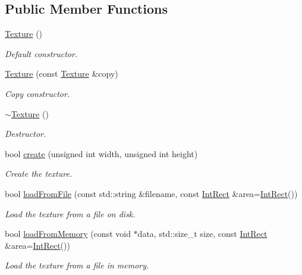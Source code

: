 \subsection*{Public Member Functions}
\begin{DoxyCompactItemize}
\item 
\mbox{\hyperlink{classsf_1_1_texture_a3e04674853b8533bf981db3173e3a4a7}{Texture}} ()
\begin{DoxyCompactList}\small\item\em Default constructor. \end{DoxyCompactList}\item 
\mbox{\hyperlink{classsf_1_1_texture_a524855cbf89de3b74be84d385fd229de}{Texture}} (const \mbox{\hyperlink{classsf_1_1_texture}{Texture}} \&copy)
\begin{DoxyCompactList}\small\item\em Copy constructor. \end{DoxyCompactList}\item 
\mbox{\hyperlink{classsf_1_1_texture_a9c5354ad40eb1c5aeeeb21f57ccd7e6c}{$\sim$\+Texture}} ()
\begin{DoxyCompactList}\small\item\em Destructor. \end{DoxyCompactList}\item 
bool \mbox{\hyperlink{classsf_1_1_texture_a89b4c7d204acf1033c3a1b6e0a3ad0a3}{create}} (unsigned int width, unsigned int height)
\begin{DoxyCompactList}\small\item\em Create the texture. \end{DoxyCompactList}\item 
bool \mbox{\hyperlink{classsf_1_1_texture_a8e1b56eabfe33e2e0e1cb03712c7fcc7}{load\+From\+File}} (const std\+::string \&filename, const \mbox{\hyperlink{classsf_1_1_rect}{Int\+Rect}} \&area=\mbox{\hyperlink{classsf_1_1_rect}{Int\+Rect}}())
\begin{DoxyCompactList}\small\item\em Load the texture from a file on disk. \end{DoxyCompactList}\item 
bool \mbox{\hyperlink{classsf_1_1_texture_a2c4adb19dd4cbee0a588eeb85e52a249}{load\+From\+Memory}} (const void $\ast$data, std\+::size\+\_\+t size, const \mbox{\hyperlink{classsf_1_1_rect}{Int\+Rect}} \&area=\mbox{\hyperlink{classsf_1_1_rect}{Int\+Rect}}())
\begin{DoxyCompactList}\small\item\em Load the texture from a file in memory. \end{DoxyCompactList}\item 

\end{DoxyCompactItemize}
